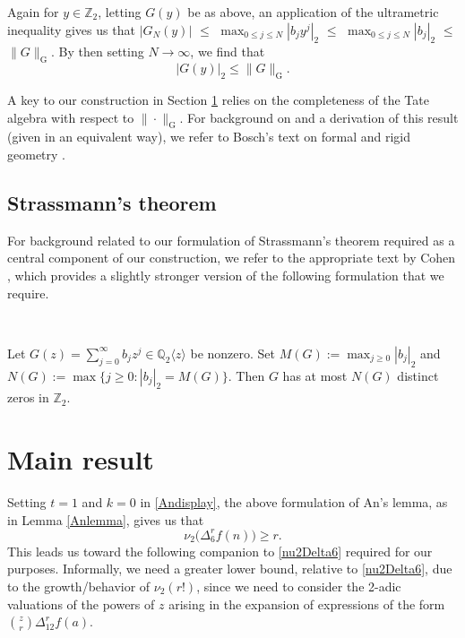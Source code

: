 \documentclass[11pt,letterpaper]{amsart}
\begin{document}
 Again for $y \in \mathbb{Z}_{2}$, letting $G(y)$ be as above, an application of the ultrametric inequality gives us that $ 
 \left| G_{N}(y) \right| $ $ \leq $
 $ \max_{0 \leq j \leq N} \left| b_{j} y^{j} \right|_{2} $
 $ \leq $
 $ \max_{0 \leq j \leq N} \left| b_{j} \right|_{2} $
 $ \leq $
 $ \| G \|_{\operatorname{G}}$. 
 By then setting $N \to \infty$, we find that 
\begin{equation}\label{dominateGauss}
 \left| G(y) \right|_{2} \leq \| G \|_{\operatorname{G}}. 
\end{equation} 

 A key to our construction in Section \ref{secmain}
 relies on the completeness of the Tate algebra with respect to $\| \cdot \|_{\operatorname{G}}$. 
 For background on and a derivation of this result (given in an equivalent way), 
 we refer to Bosch's text on formal and 
 rigid geometry \cite[p.\ 14]{Bosch2014}.

\subsection{Strassmann's theorem}
 For background related to our formulation of Strassmann's theorem required as a central component of our construction, we refer to 
 the appropriate text by 
 Cohen \cite[\S4.5.1]{Cohen2007}, which provides
 a slightly stronger version of the following formulation
 that we require. 

 \ 

 Let $ G(z) = \sum_{j=0}^{\infty} b_{j} z^{j} \in \mathbb{Q}_{2}\langle z \rangle $ be nonzero. Set 
 $ M(G) := \max_{j \geq 0} |b_{j}|_{2} $ and $ N(G) := \max\{ j \geq 0 : |b_j|_{2} = M(G) \}$. Then $G$ has at most $N(G)$ distinct zeros 
 in $\mathbb{Z}_{2}$. 

\section{Main result}\label{secmain}
 Setting $t = 1$ and $k = 0$ in \eqref{Andisplay}, the above formulation of An's lemma, as in Lemma \ref{Anlemma}, gives us that 
\begin{equation}\label{nu2Delta6}
 \nu_2\big( \Delta_{6}^{r} f(n) \big) \geq r. 
\end{equation}
 This leads us toward the following companion to \eqref{nu2Delta6} required for our purposes. Informally, we need a greater lower bound, 
 relative to \eqref{nu2Delta6}, due to the growth/behavior of $\nu_{2}(r!)$, since we need to consider the 2-adic valuations of the 
 powers of $z$ arising in the expansion of expressions of the form $\binom{z}{r} \Delta_{12}^r f(a)$. 
\end{document}
